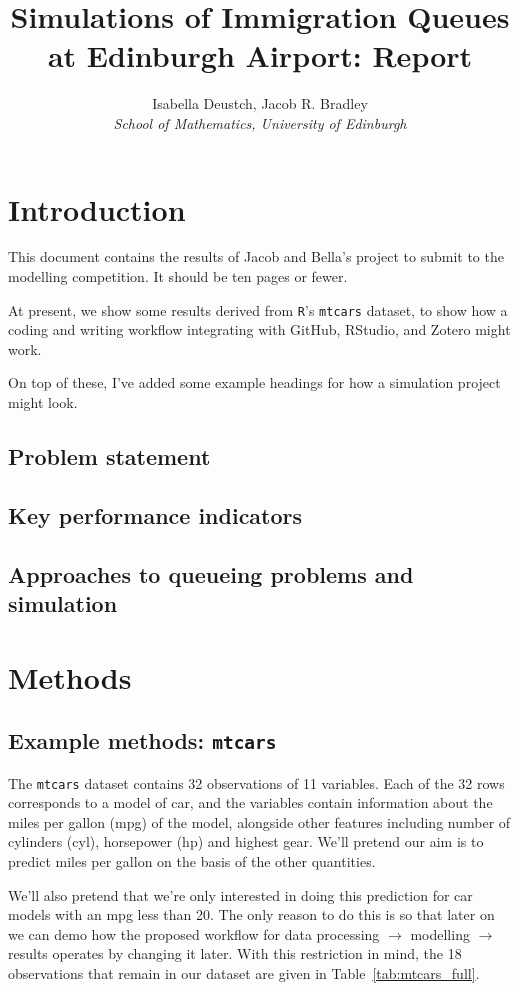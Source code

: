 \documentclass[12pt]{article}
\title{Simulations of Immigration Queues at Edinburgh Airport: Report}
\author{Isabella Deustch, Jacob R. Bradley
 \\ \emph{School of Mathematics, University of Edinburgh}}
\begin{document}
\maketitle

\section{Introduction}
This document contains the results of Jacob and Bella's project to submit to the modelling competition. It should be ten pages or fewer. 


At present, we show some results derived from \texttt{R}'s \texttt{mtcars} dataset, to show how a coding and writing workflow integrating with GitHub, RStudio, and Zotero might work.

On top of these, I've added some example headings for how a simulation project might look.

\subsection{Problem statement}
\subsection{Key performance indicators}
\subsection{Approaches to queueing problems and simulation}


\section{Methods}
\subsection{Example methods: \texttt{mtcars}}
The \texttt{mtcars} dataset contains 32 observations of 11 variables. Each of the 32 rows corresponds to a model of car, and the variables contain information about the miles per gallon (mpg) of the model, alongside other features including number of cylinders (cyl), horsepower (hp) and highest gear. We'll pretend our aim is to predict miles per gallon on the basis of the other quantities.

We'll also pretend that we're only interested in doing this prediction for car models with an mpg less than 20. The only reason to do this is so that later on we can demo how the proposed workflow for data processing $\rightarrow$ modelling $\rightarrow$ results operates by changing it later. With this restriction in mind, the 18 observations that remain in our dataset are given in Table~\ref{tab:mtcars_full}.
\end{document}

